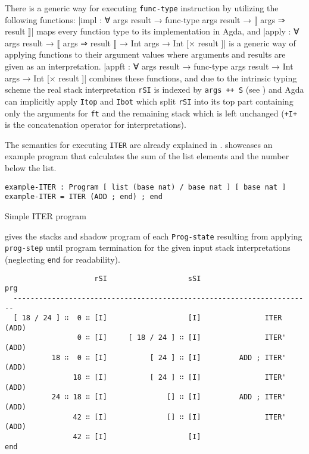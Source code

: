 There is a generic way for executing \verb/func-type/ instruction
by utilizing the following functions:
|impl : ∀ {args result} → func-type args result → ⟦ args ⇒ result ⟧|
maps every function type to its implementation in Agda, and
|apply : ∀ {args result} → ⟦ args ⇒ result ⟧ → Int args → Int [× result ]|
is a generic way of applying functions to their argument values where
arguments and results are given as an interpretation.
|appft : ∀ {args result} → func-type args result → Int args → Int [× result ]|
combines these functions, and due to the intrinsic typing scheme
the real stack interpretation \verb/rSI/ is indexed by \verb/args ++ S/
(see ) and Agda can implicitly apply \verb/Itop/ and \verb/Ibot/
which split \verb/rSI/ into its top part containing only the
arguments for \verb/ft/ and the remaining stack which is left unchanged
(\verb/+I+/ is the concatenation operator for interpretations).

The semantics for executing \verb/ITER/ are already explained in .
 showcases an example program that
calculates the sum of the list elements and the number below the list.

\begin{listing}[!ht]
\begin{verbatim}
example-ITER : Program [ list (base nat) / base nat ] [ base nat ]
example-ITER = ITER (ADD ; end) ; end
\end{verbatim}
\caption{Simple ITER program}
\label{example:ITER-ADD}
\end{listing}

 gives the stacks and shadow program of each \verb/Prog-state/
resulting from applying \verb/prog-step/ until program termination
for the given input stack interpretations (neglecting \verb/end/ for readability).

\begin{table}[!ht]
\begin{verbatim}
                     rSI                   sSI                       prg
  ----------------------------------------------------------------------
  [ 18 / 24 ] ∷  0 ∷ [I]                   [I]               ITER  (ADD)
                 0 ∷ [I]     [ 18 / 24 ] ∷ [I]               ITER' (ADD)
           18 ∷  0 ∷ [I]          [ 24 ] ∷ [I]         ADD ; ITER' (ADD)
                18 ∷ [I]          [ 24 ] ∷ [I]               ITER' (ADD)
           24 ∷ 18 ∷ [I]              [] ∷ [I]         ADD ; ITER' (ADD)
                42 ∷ [I]              [] ∷ [I]               ITER' (ADD)
                42 ∷ [I]                   [I]                       end
\end{verbatim}
\caption{program states during execution of }
\label{prog-step:ITER-ADD}
\end{table}

